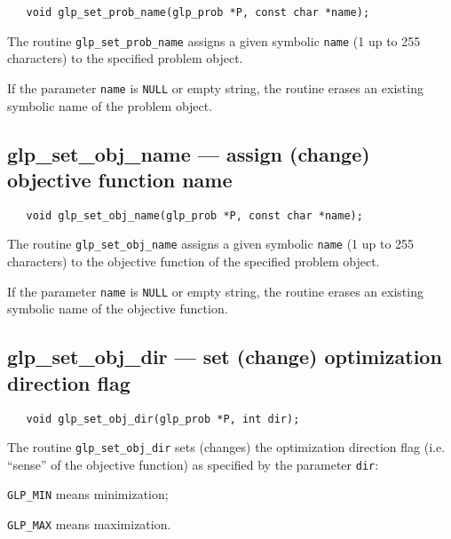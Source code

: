 \synopsis

\begin{verbatim}
   void glp_set_prob_name(glp_prob *P, const char *name);
\end{verbatim}

\description

The routine \verb|glp_set_prob_name| assigns a given symbolic
\verb|name| (1 up to 255 characters) to the specified problem object.

If the parameter \verb|name| is \verb|NULL| or empty string, the
routine erases an existing symbolic name of the problem object.

\subsection{glp\_set\_obj\_name --- assign (change) objective function
name}

\synopsis

\begin{verbatim}
   void glp_set_obj_name(glp_prob *P, const char *name);
\end{verbatim}

\description

The routine \verb|glp_set_obj_name| assigns a given symbolic
\verb|name| (1 up to 255 characters) to the objective function of the
specified problem object.

If the parameter \verb|name| is \verb|NULL| or empty string, the
routine erases an existing symbolic name of the objective function.

\newpage

\subsection{glp\_set\_obj\_dir --- set (change) optimization direction
flag}

\synopsis

\begin{verbatim}
   void glp_set_obj_dir(glp_prob *P, int dir);
\end{verbatim}

\description

The routine \verb|glp_set_obj_dir| sets (changes) the optimization
direction flag (i.e. ``sense'' of the objective function) as specified
by the parameter \verb|dir|:

\verb|GLP_MIN| means minimization;

\verb|GLP_MAX| means maximization.

